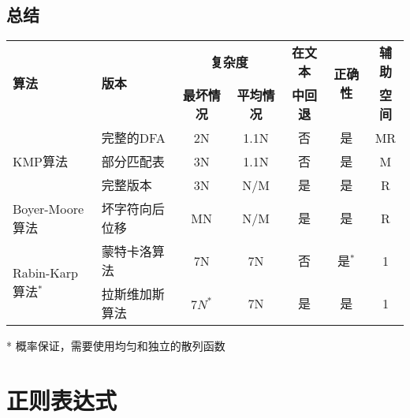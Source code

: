 \subsection{总结}
\vspace{1ex}
\begin{center}
\begin{tabular}{llccccc}
\hline
\multirow{2}{*}{\textbf{算法}} & \multirow{2}{*}{\textbf{版本}} & 
\multicolumn{2}{c}{\textbf{复杂度}} & \textbf{在文本} & 
\multirow{2}{*}{\textbf{正确性}} & \textbf{辅助}\\
\cline{3-4} & & \textbf{最坏情况} & \textbf{平均情况} & \textbf{中回退} & & 
\textbf{空间}\\
\hline
\multirow{3}{*}{KMP算法} & 完整的DFA & 2N & 1.1N & 否 & 是 & MR\\
                         & 部分匹配表 & 3N & 1.1N & 否 & 是 & M\\
						 & 完整版本 & 3N & N/M & 是 & 是 & R\\
\hline
Boyer-Moore算法 & 坏字符向后位移 & MN & N/M & 是 & 是 & R\\
\hline
\multirow{2}{*}{Rabin-Karp算法$^*$} & 蒙特卡洛算法 & 7N & 7N & 否 & 是$^*$ & 1\\
                         & 拉斯维加斯算法 & $7N^*$ & 7N & 是 & 是 & 1\\
\hline
\end{tabular}
\end{center}
\small{* 概率保证，需要使用均匀和独立的散列函数}


\section{正则表达式} %

